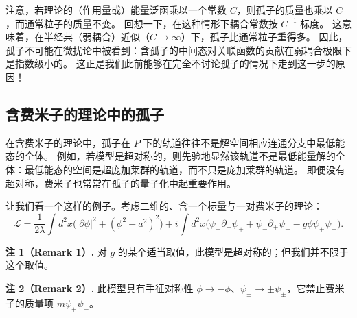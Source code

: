 注意，若理论的（作用量或）能量泛函乘以一个常数 $C$，则孤子的质量也乘以 $C$，而通常粒子的质量不变。
回想一下，在这种情形下耦合常数按 $C^{-1}$ 标度。
这意味着，在半经典（弱耦合）近似（$C\to\infty$）下，孤子比通常粒子重得多。
因此，孤子不可能在微扰论中被看到：含孤子的中间态对关联函数的贡献在弱耦合极限下是指数级小的。
这正是我们此前能够在完全不讨论孤子的情况下走到这一步的原因！



\subsection{含费米子的理论中的孤子}

在含费米子的理论中，孤子在 $P$ 下的轨道往往不是解空间相应连通分支中最低能态的全体。
例如，若模型是超对称的，则先验地显然该轨道不是最低能量解的全体：最低能态的空间是超庞加莱群的轨道，而不只是庞加莱群的轨道。
即便没有超对称，费米子也常常在孤子的量子化中起重要作用。

让我们看一个这样的例子。考虑二维的、含一个标量与一对费米子的理论：
\begin{equation}
  \tag{9.1}
  \label{eq:9-1}
  \mathcal{L}=\frac{1}{2\lambda}\int d^2x\bigl(|\partial\phi|^2+(\phi^2-a^2)^2\bigr)
  +i\int d^2x\bigl(\psi_+\partial_-\psi_++\psi_-\partial_+\psi_--g\phi\psi_+\psi_-\bigr).
\end{equation}

\textbf{注 1（Remark 1）.}
对 $g$ 的某个适当取值，此模型是超对称的；但我们并不限于这个取值。

\textbf{注 2（Remark 2）.}
此模型具有手征对称性 $\phi\to-\phi$、$\psi_\pm\to\pm\psi_\pm$，它禁止费米子的质量项 $m\psi_+\psi_-$。

